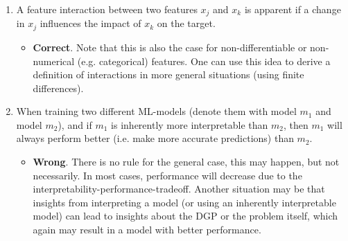 \begin{enumerate}
    	\item A feature interaction between two features $x_j$ and $x_k$ is apparent if a change in $x_j$ influences the impact of $x_k$ on the target.
    	\begin{itemize}
    		\item[$\Rightarrow$] \textbf{Correct}. Note that this is also the case for non-differentiable or non-numerical (e.g. categorical) features. One can use this idea to derive a definition of interactions in more general situations (using finite differences).
    	\end{itemize}

    	\item When training two different ML-models (denote them with model \(m_1\) and model $m_2$), and if $m_1$ is inherently more interpretable than \(m_2\), then $m_1$ will always perform better (i.e. make more accurate predictions) than $m_2$.
    	\begin{itemize}
    		\item[$\Rightarrow$] \textbf{Wrong}. There is no rule for the general case, this may happen, but not necessarily. In most cases, performance will decrease due to the interpretability-performance-tradeoff. Another situation may be that insights from interpreting a model (or using an inherently interpretable model) can lead to insights about the DGP or the problem itself, which again may result in a model with better performance.
    	\end{itemize}



\end{enumerate}
